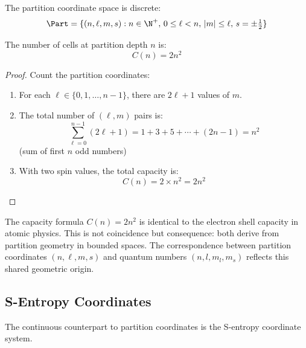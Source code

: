 The partition coordinate space is discrete:
\begin{equation}
\Part = \{(n, \ell, m, s) : n \in \N^+, \, 0 \leq \ell < n, \, |m| \leq \ell, \, s = \pm\tfrac{1}{2}\}
\end{equation}

\begin{theorem}
\label{thm:capacity}
The number of cells at partition depth $n$ is:
\begin{equation}
C(n) = 2n^2
\label{eq:capacity}
\end{equation}
\end{theorem}

\begin{proof}
Count the partition coordinates:
\begin{enumerate}
    \item For each $\ell \in \{0, 1, \ldots, n-1\}$, there are $2\ell + 1$ values of $m$.
    \item The total number of $(\ell, m)$ pairs is:
    \begin{equation}
    \sum_{\ell=0}^{n-1} (2\ell + 1) = 1 + 3 + 5 + \cdots + (2n-1) = n^2
    \end{equation}
    (sum of first $n$ odd numbers)
    \item With two spin values, the total capacity is:
    \begin{equation}
    C(n) = 2 \times n^2 = 2n^2
    \end{equation}
\end{enumerate}
\end{proof}

\begin{remark}
The capacity formula $C(n) = 2n^2$ is identical to the electron shell capacity in atomic physics. This is not coincidence but consequence: both derive from partition geometry in bounded spaces. The correspondence between partition coordinates $(n, \ell, m, s)$ and quantum numbers $(n, l, m_l, m_s)$ reflects this shared geometric origin.
\end{remark}

\subsection{S-Entropy Coordinates}

The continuous counterpart to partition coordinates is the S-entropy coordinate system.

